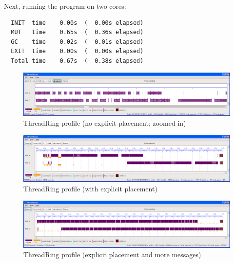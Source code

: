 Next, running the program on two cores:

\begin{verbatim}
  INIT  time    0.00s  (  0.00s elapsed)
  MUT   time    0.65s  (  0.36s elapsed)
  GC    time    0.02s  (  0.01s elapsed)
  EXIT  time    0.00s  (  0.00s elapsed)
  Total time    0.67s  (  0.38s elapsed)
\end{verbatim}

\begin{figure}
\begin{center}
\includegraphics[scale=0.3]{threadring1.png}
\end{center}
\caption{ThreadRing profile (no explicit placement; zoomed in)}
\label{f:threadring1}
\end{figure}

\begin{figure}
\begin{center}
\includegraphics[scale=0.3]{threadring2.png}
\end{center}
\caption{ThreadRing profile (with explicit placement)}
\label{f:threadring2}
\end{figure}

\begin{figure}
\begin{center}
\includegraphics[scale=0.3]{threadring3.png}
\end{center}
\caption{ThreadRing profile (explicit placement and more messages)}
\label{f:threadring3}
\end{figure}

